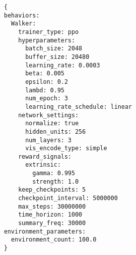 \begin{lstlisting}[caption={Trainer Konfigurationsdatei},captionpos=b,label={lst:trainer_konfiguration}]
{
behaviors:
  Walker:
    trainer_type: ppo
    hyperparameters:
      batch_size: 2048
      buffer_size: 20480
      learning_rate: 0.0003
      beta: 0.005
      epsilon: 0.2
      lambd: 0.95
      num_epoch: 3
      learning_rate_schedule: linear
    network_settings:
      normalize: true
      hidden_units: 256
      num_layers: 3
      vis_encode_type: simple
    reward_signals:
      extrinsic:
        gamma: 0.995
        strength: 1.0
    keep_checkpoints: 5
    checkpoint_interval: 5000000
    max_steps: 30000000
    time_horizon: 1000
    summary_freq: 30000
environment_parameters:
  environment_count: 100.0
}
\end{lstlisting}